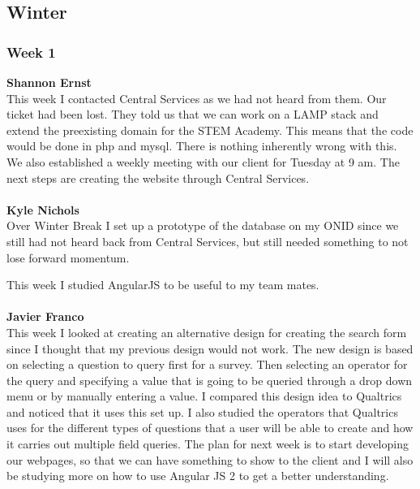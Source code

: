 \documentclass[../final.tex]{subfiles}
\begin{document}
\subsection{Winter}
\subsubsection{Week 1}
\textbf{Shannon Ernst} \\
This week I contacted Central Services as we had not heard from them. Our ticket had been lost. They told us that we can work on a LAMP stack and extend the preexisting domain for the STEM Academy. This means that the code would be done in php and mysql. There is nothing inherently wrong with this. We also established a weekly meeting with our client for Tuesday at 9 am. The next steps are creating the website through Central Services. \\ \\
\textbf{Kyle Nichols}\\ 
Over Winter Break I set up a prototype of the database on my ONID since we still had not heard back from Central Services, but still needed something to not lose forward momentum.

This week I studied AngularJS to be useful to my team mates.\\ \\
\textbf{Javier Franco}\\
This week I looked at creating an alternative design for creating the search form since I thought that my previous design would not work. The new design is based on selecting a question to query first for a survey. Then selecting an operator for the query and specifying a value that is going to be queried through a drop down menu or by manually entering a value. I compared this design idea to Qualtrics and noticed that it uses this set up. I also studied the operators that Qualtrics uses for the different types of questions that a user will be able to create and how it carries out multiple field queries. The plan for next week is to start developing our webpages, so that we can have something to show to the client and I will also be studying more on how to use Angular JS 2 to get a better understanding. \\
\end{document}
